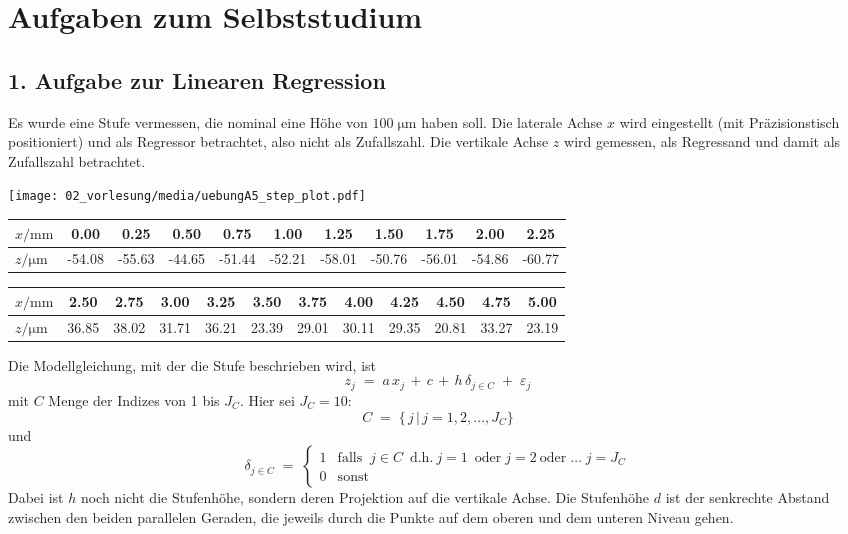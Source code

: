 \section{Aufgaben zum Selbststudium}
\subsection{1. Aufgabe zur Linearen Regression}
\label{Vorl2Regressionsaufg1}
Es wurde eine Stufe vermessen, die nominal eine Höhe von $100 \; \mathrm{\mu m}$ haben soll.
Die laterale Achse $x$ wird eingestellt (mit Präzisionstisch positioniert)
und als Regressor betrachtet, also nicht als Zufallszahl.
Die vertikale Achse $z$ wird gemessen, als Regressand und damit als Zufallszahl
betrachtet.

\begin{center}
	\texttt{[image: 02\_vorlesung/media/uebungA5\_step\_plot.pdf]}
\end{center}


\begin{tabular}{l|c|c|c|c|c|c|c|c|c|c}
	\hline
	$x / \mathrm{mm}$ &
	0.00 & 0.25 & 0.50 & 0.75 & 1.00 & 1.25 & 1.50 & 1.75 & 2.00 & 2.25 \\
	\hline
	$z / \mathrm{\mu m}$ &
	-54.08 &-55.63 &-44.65 &-51.44 &-52.21 &-58.01 &-50.76 &-56.01 &-54.86 &-60.77\\
	\hline
\end{tabular}

\vspace{2mm}

\begin{tabular}{l|c|c|c|c|c|c|c|c|c|c|c}
	\hline
	$x / \mathrm{mm}$  & 2.50 &
	2.75 & 3.00 & 3.25 & 3.50 & 3.75 & 4.00 & 4.25 & 4.50 & 4.75 & 5.00 \\
	\hline
	$z / \mathrm{\mu m}$ &36.85 &38.02 &31.71 &36.21 &23.39 &29.01 &30.11 &29.35 &20.81 &33.27 &23.19\\
	\hline
\end{tabular}

\vspace{2mm}

Die Modellgleichung, mit der die Stufe beschrieben wird, ist
$$
z_j \; = \; a \, x_j \, + \, c \, + \, h \, \delta_{j \in C} \; + \; \varepsilon_j
$$
mit $C$ Menge der Indizes von 1 bis $J_C$. Hier sei $J_C = 10$:
$$
C \; = \; \{\, j \, | \, j = 1, 2, \dots, J_C \}
$$
und
$$
\delta_{j \in C} \; = \; \left\{
\begin{array}{ll}
1 & \mathrm{falls} \; \;  j \in C \; \mathrm{~d.h.~} j = 1 \; \mathrm{~oder} \; j = 2
\mathrm{~oder} \; \dots \; j = J_C\\
0 & \mathrm{sonst}
\end{array} \right.
$$
Dabei ist $h$ noch nicht die Stufenhöhe, sondern deren Projektion auf die vertikale Achse.
Die Stufenhöhe $d$ ist der senkrechte Abstand zwischen den beiden parallelen Geraden, die jeweils durch die Punkte auf dem oberen und dem unteren Niveau gehen.

